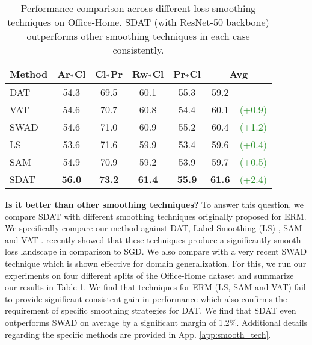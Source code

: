 \documentclass[table,dvipsnames]{article}
\newcommand{\veryshortarrow}[1][3pt]{\mathrel{\hbox{\rule[\dimexpr\fontdimen22\textfont2-.2pt\relax]{#1}{.4pt}}\mkern-4mu\hbox{\usefont{U}{lasy}{m}{n}\symbol{41}}}} \newcommand{\cmark}{\ding{51}}\newcommand{\xmark}{\ding{55}}\usepackage{amssymb}\usepackage{pifont}\usepackage[hyphens]{url}
\theoremstyle{plain}
\theoremstyle{definition}
\theoremstyle{remark}
\begin{document}
\begin{table}
\caption{Performance comparison across different loss smoothing techniques on Office-Home. SDAT (with ResNet-50 backbone) outperforms other smoothing techniques in each case consistently.}
\vskip 0.15in
    \begin{adjustbox}{max width=\linewidth}
    \begin{tabular}{l|cccc|cc}
    \hline
    {Method} & Ar$\veryshortarrow$Cl & Cl$\veryshortarrow$Pr & Rw$\veryshortarrow$Cl &  Pr$\veryshortarrow$Cl & \multicolumn{2}{c}{{Avg}}\\
\hline \hline
       {DAT} & 54.3 & 69.5 & 60.1 & 55.3 &  59.2 &\\
         
         {VAT} & 54.6 &70.7&  60.8 & 54.4 & 60.1 &  \textcolor{ForestGreen}{(+0.9)}\\
       {SWAD} & 54.6& 71.0 & 60.9 & 55.2 & 60.4 & \textcolor{ForestGreen}{(+1.2)} \\
        {LS}  & 53.6  & 71.6 & 59.9 &  53.4 & 59.6 & \textcolor{ForestGreen}{(+0.4)}  \\
        {SAM}  & 54.9  & 70.9 & 59.2 &  53.9 & 59.7 & \textcolor{ForestGreen}{(+0.5)}  \\
        {SDAT} &\textbf{56.0}&  \textbf{73.2} & \textbf{61.4} &\textbf{55.9} & \textbf{61.6} &\textcolor{ForestGreen}{(+2.4)}
  
\end{tabular}
    \end{adjustbox}
    
    \label{tab:diff_smooth}
\end{table}

\textbf{Is it better than other smoothing techniques?}
To answer this question, we compare SDAT with different smoothing techniques originally proposed for ERM. We specifically compare our method against DAT, Label Smoothing (LS) \citep{szegedy2016rethinking}, SAM \cite{foret2021sharpnessaware} and VAT \citep{miyato2019vat}. \citet{stutz2021relating} recently showed that these techniques produce a  significantly smooth loss landscape in comparison to SGD. We also compare with a very recent SWAD \citep{cha2021swad} technique which is shown effective for domain generalization. For this, we run our experiments on four different splits of the Office-Home dataset and summarize our results in Table \ref{tab:diff_smooth}. We find that techniques for ERM (LS, SAM and VAT) fail to provide significant consistent gain in performance which also confirms the requirement of specific smoothing strategies for DAT. We find that SDAT even outperforms SWAD on average by a significant margin of 1.2\%. Additional details regarding the specific methods are provided in App. \ref{app:smooth_tech}.
\end{document}
